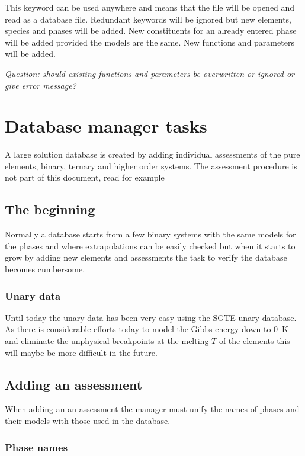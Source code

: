 \documentclass[12pt]{article}
\begin{document}
This keyword can be used anywhere and means that the file will be
opened and read as a database file.  Redundant keywords will be
ignored but new elements, species and phases will be added.  New
constituents for an already entered phase will be added provided the
models are the same.  New functions and parameters will be added.

{\em Question: should existing functions and parameters be overwritten or ignored or
give error message?}

\section{Database manager tasks}\label{sec:manager}

A large solution database is created by adding individual assessments
of the pure elements, binary, ternary and higher order systems.
The assessment procedure is not part of this document, read for
example~\cite{07Luk}

\subsection{The beginning}

Normally a database starts from a few binary systems with the same
models for the phases and where extrapolations can be easily checked
but when it starts to grow by adding new elements and assessments the
task to verify the database becomes cumbersome.

\subsubsection{Unary data}

Until today the unary data has been very easy using the SGTE unary
database\cite{91Din}.  As there is considerable efforts today to model
the Gibbs energy down to 0~K and eliminate the unphysical breakpoints
at the melting $T$ of the elements this will maybe be more difficult
in the future.

\subsection{Adding an assessment}

When adding an an assessment the manager must unify the names of
phases and their models with those used in the database.

\subsubsection{Phase names}
\end{document}
